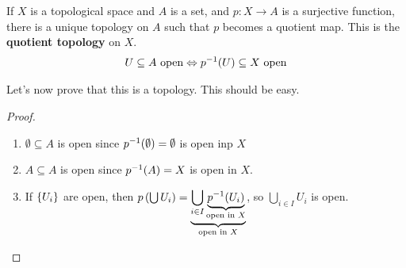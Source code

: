 \documentclass[12pt, twosided]{article}
\begin{document}
\begin{df}
  If \(X\) is a topological space and \(A\) is a set, and \(p: X \to A\) is a surjective function, there is a unique topology on \(A\) such that \(p\) becomes a quotient map. This is the \textbf{quotient topology} on \(X\).
  \begin{align*}
    U \subseteq A \text{ open} \Leftrightarrow p^{-1}(U) \subseteq X \text{ open}
  \end{align*}
\end{df}
Let's now prove that this is a topology. This should be easy.
\begin{proof}
  \begin{enumerate}
  \item \(\emptyset \subseteq A\) is open since \(p^{-1}(\emptyset) = \emptyset\) is open inp \(X\)
  \item \(A \subseteq A\) is open since \(p^{-1}(A) = X\) is open in \(X\).
  \item If \(\left\{ U_i \right\}\) are open, then \(p\left(\bigcup U_i \right) = \underbrace{\bigcup_{i \in I} \underbrace{p^{-1}(U_i)}_{\text{open in } X}}_{\text{open in } X}\), so \(\bigcup_{i \in I} U_i\) is open.
  \end{enumerate}
\end{proof}
\end{document}
